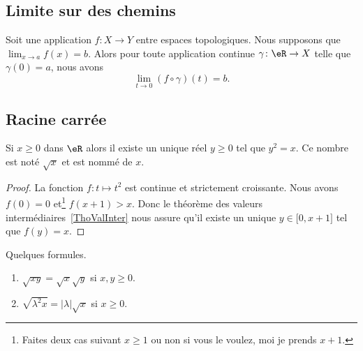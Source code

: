 \subsection{Limite sur des chemins}

\begin{proposition}		\label{PROPooREUUooUNDFRi}
	Soit une application \(f \colon X\to Y  \) entre espaces topologiques. Nous supposons que \( \lim_{x\to a}f(x)=b\). Alors pour toute application continue \(\gamma \colon \eR\to X  \) telle que \( \gamma(0)=a\), nous avons
	\begin{equation}
		\lim_{t\to 0}(f\circ\gamma)(t)=b.
	\end{equation}
\end{proposition}

\subsection{Racine carrée}


\begin{corollaryDef}     \label{DEFooGQTYooORuvQb}
	Si \( x\geq 0\) dans \( \eR\) alors il existe un unique réel \( y\geq 0\) tel que \( y^2=x\). Ce nombre est noté \( \sqrt{x}\) et est nommé  de \( x\).
\end{corollaryDef}

\begin{proof}
	La fonction \( f\colon t\mapsto t^2\) est continue et strictement croissante. Nous avons \( f(0)=0\) et\footnote{Faites deux cas suivant \( x\geq 1\) ou non si vous le voulez, moi je prends \( x+1\).} \( f(x+1)>x\). Donc le théorème des valeurs intermédiaires~\ref{ThoValInter} nous assure qu'il existe un unique \( y\in\mathopen[ 0 , x+1 \mathclose]\) tel que \( f(y)=x\).
\end{proof}

\begin{lemma}       \label{LEMooWSVNooKsymDy}
	Quelques formules.
	\begin{enumerate}
		\item
		      $\sqrt{ xy }=\sqrt{ x }\sqrt{ y }$ si \( x,y\geq 0\).
		\item       \label{ITEMooEPHBooCEeJOD}
		      \( \sqrt{ \lambda^2 x }=| \lambda |\sqrt{ x }\) si \( x\geq 0\).
	\end{enumerate}
\end{lemma}

